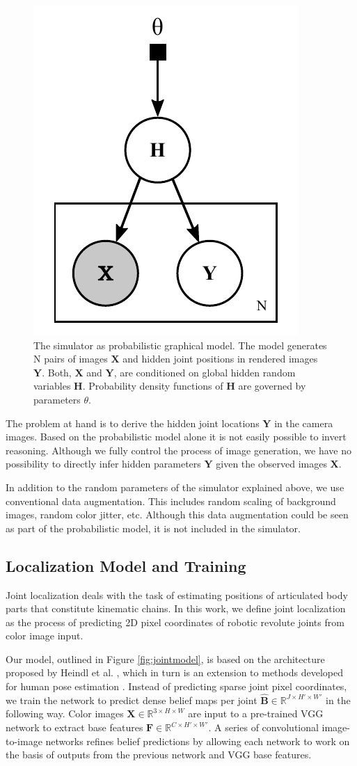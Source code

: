 \documentclass[conference]{IEEEtran}
\begin{document}
    \begin{figure}[htbp]
        \centerline{\includegraphics[width=0.33\columnwidth]{figures/probModel/probModel.pdf}}
        \caption{\label{fig:probModel} The simulator as probabilistic graphical model. The model generates $\mathrm{N}$ pairs of images $\mathbf{X}$ and hidden joint positions in rendered images $\mathbf{Y}$. Both, $\mathbf{X}$ and $\mathbf{Y}$, are conditioned on global hidden random variables $\mathbf{H}$. Probability density functions of $\mathbf{H}$ are governed by parameters $\theta$.}
    \end{figure}

    The problem at hand is to derive the hidden joint locations $\mathbf{Y}$ in the camera images. Based on the probabilistic model alone it is not easily possible to invert reasoning. Although we fully control the process of image generation, we have no possibility to directly infer hidden parameters $\mathbf{Y}$ given the observed images $\mathbf{X}$. 
    
    In addition to the random parameters of the simulator explained above, we use conventional data augmentation. This includes random scaling of background images, random color jitter, etc. Although this data augmentation could be seen as part of the probabilistic model, it is not included in the simulator. 
    

\subsection{Localization Model and Training}

    Joint localization deals with the task of estimating positions of articulated body parts that constitute kinematic chains. In this work, we define joint localization as the process of predicting 2D pixel coordinates of robotic revolute joints from color image input. 
    
    Our model, outlined in Figure \ref{fig:jointmodel}, is based on the architecture proposed by Heindl et al. \cite{cheind2019disp}, which in turn is an extension to methods developed for human pose estimation \cite{cao2017realtime, newell2016stacked}. Instead of predicting sparse joint pixel coordinates, we train the network to predict dense belief maps per joint $\hat{\mathbf{B}} \in \mathbb{R}^{J \times H' \times W'}$ in the following way. Color images $\mathbf{X} \in \mathbb{R}^{3 \times H\times W}$ are input to a pre-trained VGG network \cite{simonyan2014very} to extract base features $\mathbf{F} \in \mathbb{R}^{C \times H' \times W'}$. A series of convolutional image-to-image networks refines belief predictions by allowing each network to work on the basis of outputs from the previous network and VGG base features.
\end{document}
